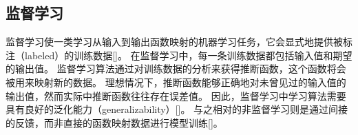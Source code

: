 
\subsection{监督学习}

监督学习使一类学习从输入到输出函数映射的机器学习任务，它会显式地提供被标注（labeled）的训练数据[]。
在监督学习中，每一条训练数据都包括输入值和期望的输出值。
监督学习算法通过对训练数据的分析来获得推断函数，这个函数将会被用来映射新的数据。
理想情况下，推断函数能够正确地对未曾见过的输入值的输出值，然而实际中推断函数往往存在误差值。
因此，监督学习中学习算法需要具有良好的泛化能力（generalizability）[]。
与之相对的非监督学习则是通过间接的反馈，而非直接的函数映射数据进行模型训练[]。


